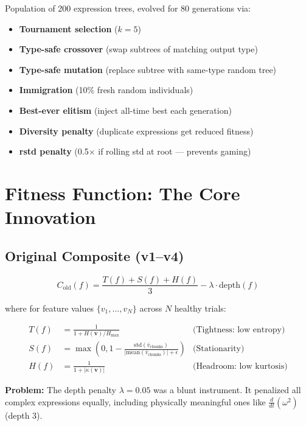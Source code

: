 \documentclass[11pt,a4paper]{article}
\begin{document}
Population of 200 expression trees, evolved for 80 generations via:
\begin{itemize}
    \item \textbf{Tournament selection} ($k=5$)
    \item \textbf{Type-safe crossover} (swap subtrees of matching output type)
    \item \textbf{Type-safe mutation} (replace subtree with same-type random tree)
    \item \textbf{Immigration} (10\% fresh random individuals)
    \item \textbf{Best-ever elitism} (inject all-time best each generation)
    \item \textbf{Diversity penalty} (duplicate expressions get reduced fitness)
    \item \textbf{rstd penalty} (0.5$\times$ if rolling std at root --- prevents gaming)
\end{itemize}

\section{Fitness Function: The Core Innovation}

\subsection{Original Composite (v1--v4)}

\begin{equation}
C_{\text{old}}(f) = \frac{T(f) + S(f) + H(f)}{3} - \lambda \cdot \text{depth}(f)
\label{eq:old_composite}
\end{equation}

where for feature values $\{v_1, \ldots, v_N\}$ across $N$ healthy trials:

\begin{align}
T(f) &= \frac{1}{1 + H(\mathbf{v})/H_{\max}} & \text{(Tightness: low entropy)} \\
S(f) &= \max\left(0, 1 - \frac{\text{std}(\bar{v}_{\text{chunks}})}
{|\text{mean}(\bar{v}_{\text{chunks}})| + \epsilon}\right) & \text{(Stationarity)} \\
H(f) &= \frac{1}{1 + |\kappa(\mathbf{v})|} & \text{(Headroom: low kurtosis)}
\end{align}

\textbf{Problem:} The depth penalty $\lambda = 0.05$ was a blunt instrument.
It penalized all complex expressions equally, including physically meaningful
ones like $\frac{d}{dt}(\omega^2)$ (depth 3).
\end{document}
